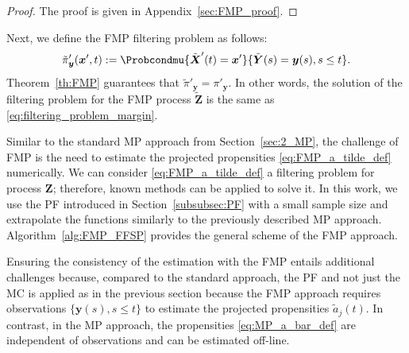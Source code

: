 \begin{proof}
    The proof is given in Appendix~\ref{sec:FMP_proof}.
\end{proof}

Next, we define the \ac{FMP} filtering problem as follows:
\begin{equation}
    \label{eq:pi_tilde_def}
    \tilde{\pi}'_{\boldsymbol{y}} (\boldsymbol{x}', t) := \Probcondmu{\tilde{\boldsymbol{X}}'(t) = \boldsymbol{x}' }{ \tilde{\boldsymbol{Y}}(s) = \boldsymbol{y}(s), s \leq t } .
\end{equation}
Theorem~\ref{th:FMP} guarantees that $\tilde{\pi}'_{\boldsymbol{y}} = \pi'_{\boldsymbol{y}}$. In other words, the solution of the filtering problem for the \ac{FMP} process $\tilde{\boldsymbol{Z}}$ is the same as \eqref{eq:filtering_problem_margin}. 

Similar to the standard \ac{MP} approach from Section~\ref{sec:2_MP}, the challenge of \ac{FMP} is the need to estimate the projected propensities \eqref{eq:FMP_a_tilde_def} numerically. We can consider \eqref{eq:FMP_a_tilde_def} a filtering problem for process $\boldsymbol{Z}$; therefore, known methods can be applied to solve it. In this work, we use the \acf{PF} introduced in Section~\ref{subsubsec:PF} with a small sample size and extrapolate the functions similarly to the previously described \ac{MP} approach. Algorithm~\ref{alg:FMP_FFSP} provides the general scheme of the \ac{FMP} approach.

Ensuring the consistency of the estimation with the \ac{FMP} entails additional challenges because, compared to the standard approach, the \ac{PF} and not just the \ac{MC} is applied as in the previous section because the \ac{FMP} approach requires observations $\{ \boldsymbol{y}(s), s \leq t \}$ to estimate the projected propensities $\tilde{a}_j(t)$. In contrast, in the \ac{MP} approach, the propensities \eqref{eq:MP_a_bar_def} are independent of observations and can be estimated off-line.

